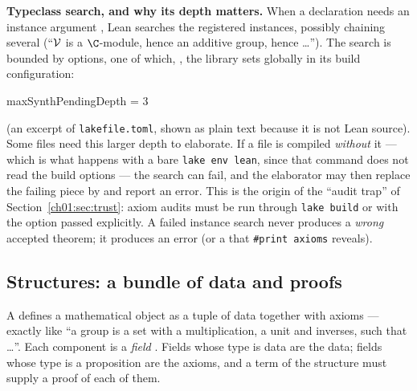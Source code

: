 \textbf{Typeclass search, and why its depth matters.} When a declaration needs an instance argument
\lean{[C X]}, Lean searches the registered instances, possibly chaining several (``$\mathcal{V}$ is a
$\C$-module, hence an additive group, hence \dots''). The search is bounded by options, one of which,
, the library sets globally in its build configuration:
\begin{plaincode}
[leanOptions]
maxSynthPendingDepth = 3
\end{plaincode}
(an excerpt of \texttt{lakefile.toml}, shown as plain text because it is not Lean source). Some
files need this larger depth to elaborate. If a file is compiled \emph{without} it --- which is what
happens with a bare \texttt{lake env lean}, since that command does not read the build options ---
the search can fail, and the elaborator may then replace the failing piece by  and
report an error. This is the origin of the ``audit trap'' of Section~\ref{ch01:sec:trust}: axiom
audits must be run through \texttt{lake build} or with the option passed explicitly. A failed
instance search never produces a \emph{wrong} accepted theorem; it produces an error (or a
 that \texttt{\#print axioms} reveals).

\subsection{Structures: a bundle of data and proofs}\label{ch01:sec:structures}

A  defines a mathematical object as a tuple of data together with axioms --- exactly
like ``a group is a set with a multiplication, a unit and inverses, such that \dots''. Each component
is a \emph{field} . Fields whose type is data are the data; fields whose type is a
proposition are the axioms, and a term of the structure must supply a proof of each of them.


